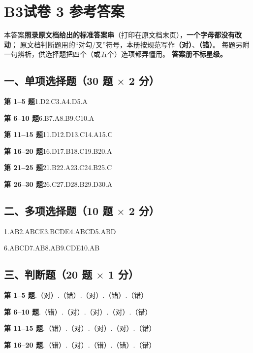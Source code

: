 \chapter*{B3\quad 试卷 3 参考答案}

\begin{tishi}
本答案\textbf{照录原文档给出的标准答案串}（打印在原文档末页），\textbf{一个字母都没有改动}；
原文档判断题用的“对勾/叉”符号，本册按规范写作\textbf{（对）}、\textbf{（错）}。
每题另附一句辨析，供选择题把四个（或五个）选项都弄懂用。
\textbf{答案册不标星级。}
\end{tishi}

\section*{一、单项选择题（30 题 $\times$ 2 分）}

\noindent\textbf{第 1--5 题}\quad 1.D\quad 2.C\quad 3.A\quad 4.D\quad 5.A\par
\noindent\textbf{第 6--10 题}\quad 6.B\quad 7.A\quad 8.B\quad 9.C\quad 10.A\par
\noindent\textbf{第 11--15 题}\quad 11.D\quad 12.D\quad 13.C\quad 14.A\quad 15.C\par
\noindent\textbf{第 16--20 题}\quad 16.D\quad 17.B\quad 18.C\quad 19.B\quad 20.A\par
\noindent\textbf{第 21--25 题}\quad 21.B\quad 22.A\quad 23.C\quad 24.B\quad 25.C\par
\noindent\textbf{第 26--30 题}\quad 26.C\quad 27.D\quad 28.B\quad 29.D\quad 30.A

\section*{二、多项选择题（10 题 $\times$ 2 分）}

\noindent 1.AB\quad 2.ABCE\quad 3.BCDE\quad 4.ABCD\quad 5.ABD\par
\noindent 6.ABCD\quad 7.AB\quad 8.AB\quad 9.CDE\quad 10.AB

\section*{三、判断题（20 题 $\times$ 1 分）}

\noindent\textbf{第 1--5 题}.（对）.（错）.（对）.（错）.（错）\par
\noindent\textbf{第 6--10 题}.（错）.（对）.（对）.（对）.（错）\par
\noindent\textbf{第 11--15 题}.（错）.（对）.（对）.（对）.（错）\par
\noindent\textbf{第 16--20 题}.（错）.（对）.（错）.（错）.（错）

